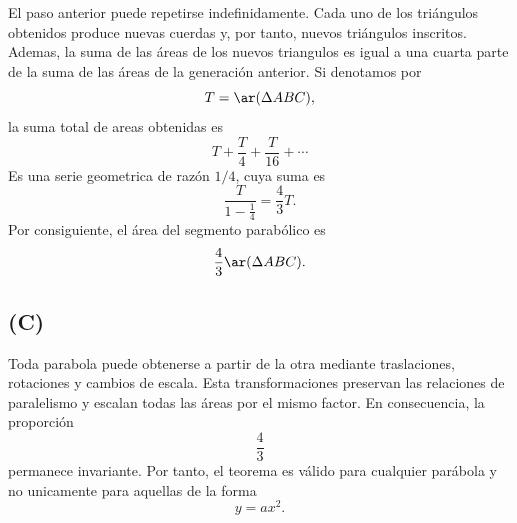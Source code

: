 \documentclass[12pt,a4paper]{article}
\begin{document}
\begin{solucion}
        El paso anterior puede repetirse indefinidamente. Cada uno de los triángulos obtenidos
        produce nuevas cuerdas y, por tanto, nuevos triángulos inscritos. Ademas, la suma de las
        áreas de los nuevos triangulos es igual a una cuarta parte de la suma de las áreas de
        la generación anterior. Si denotamos por
        \begin{equation*}
            T=\ar(\Delta ABC),
        \end{equation*}
        la suma total de areas obtenidas es
        \begin{equation*}
            T+\frac{T}{4}+\frac{T}{16}+\cdots
        \end{equation*}
        Es una serie geometrica de razón $1/4$, cuya suma es
        \begin{equation*}
            \frac{T}{1-\frac{1}{4}}=\frac{4}{3}T.
        \end{equation*}
        Por consiguiente, el área del segmento parabólico es
        \begin{equation*}
            \frac{4}{3}\ar(\Delta ABC).
        \end{equation*}

        \subsection*{(C)}

        Toda parabola puede obtenerse a partir de la otra mediante traslaciones, rotaciones
        y cambios de escala. Esta transformaciones preservan las relaciones de paralelismo
        y escalan todas las áreas por el mismo factor. En consecuencia, la proporción
        \begin{equation*}
            \frac{4}{3}
        \end{equation*}
        permanece invariante. Por tanto, el teorema es válido para cualquier parábola y no
        unicamente para aquellas de la forma
        \begin{equation*}
            y=ax^{2}.
        \end{equation*}
    \end{solucion}
    
\end{document}
